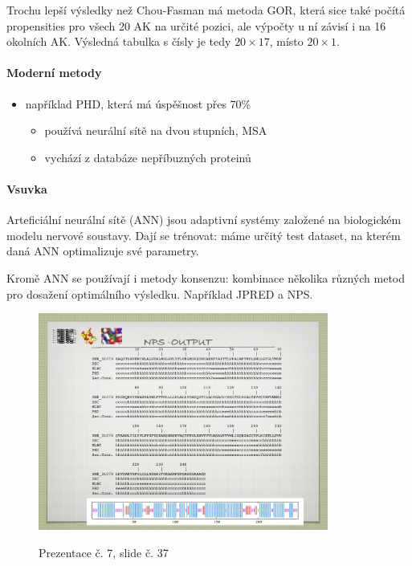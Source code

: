 \documentclass[DIV=8]{scrreprt}
\newcommand{\mybox}[2]{
    \paragraph{#1} #2
}
\begin{document}
Trochu lepší výsledky než Chou-Fasman má metoda GOR, která sice také počítá propensities pro všech 20 AK na určité pozici, ale výpočty u ní závisí i na 16 okolních AK. Výsledná tabulka s čísly je tedy \(20 \times 17\), místo \(20 \times 1\).

\paragraph{Moderní metody}
\begin{itemize}[nosep]
    \item například PHD, která má úspěšnost přes 70\%
\begin{itemize}[nosep]
    \item používá neurální sítě na dvou stupních, MSA
    \item vychází z databáze nepříbuzných proteinů
\end{itemize}

\end{itemize}



\mybox{Vsuvka}{Arteficiální neurální sítě (ANN) jsou adaptivní systémy založené na biologickém modelu nervové soustavy. Dají se trénovat: máme určitý test dataset, na kterém daná ANN optimalizuje své parametry.

Kromě ANN se používají i metody konsenzu: kombinace několika různých metod pro dosažení optimálního výsledku. Například JPRED a NPS. \begin{figure}
    \caption{Prezentace č. 7, slide č. 37}
    \includegraphics[width=0.85\textwidth]{slides-7/slide-37.jpg}
    \centering
    \label{slides-7-slide-37}
\end{figure}
}
\end{document}
